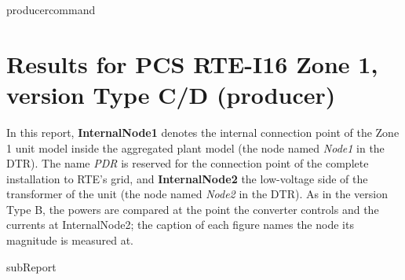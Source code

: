 {{ producercommand }}




\providecommand{\GridCircuitZoneSwitchedLine}[2]{
    The grid model and its operational point is as in the following schematic, where the line
    Zs#1:
    \begin{center}
        
    \end{center}
    \begin{center}
        \small \textbf{Note: This schematic is only a reminder of the test setup on the TSO's
        side --- the Producer's side may vary, depending on the user-provided model.}
    \end{center}
}

    \section{Results for PCS RTE-I16 Zone 1, version Type C/D ({{producer}})}

    In this report, \textbf{InternalNode1} denotes the internal connection point of the
    Zone 1 unit model inside the aggregated plant model (the node named \emph{Node1} in
    the DTR). The name \emph{PDR} is reserved for the connection point of the complete
    installation to RTE's grid, and \textbf{InternalNode2} the low-voltage side of the
    transformer of the unit (the node named \emph{Node2} in the DTR). As in the version Type B,
    the powers are compared at the point the converter controls and the currents at
    InternalNode2; the caption of each figure names the node its magnitude is measured at.

    {{subReport}}
    \newpage

